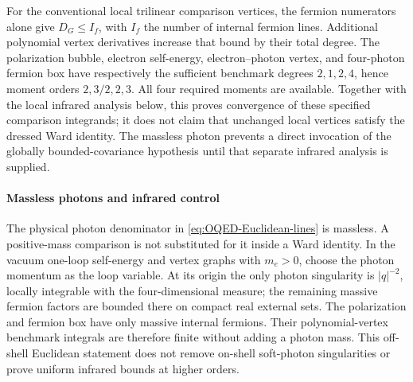 \documentclass[final,5p,times,twocolumn,numbers,nopreprintline]{elsarticle}
\numberwithin{equation}{section}
\theoremstyle{definition}
\theoremstyle{remark}
\begin{document}
For the conventional local trilinear comparison vertices, the fermion
numerators alone give \(D_G\leq I_f\), with \(I_f\) the number
of internal fermion lines. Additional polynomial vertex derivatives
increase that bound by their total degree. The polarization bubble,
electron self-energy, electron--photon vertex, and four-photon fermion
box have respectively the sufficient benchmark degrees
\(2,1,2,4\), hence moment orders \(2,3/2,2,3\).
All four required moments are available. Together with the local
infrared analysis below, this proves convergence of these specified
comparison integrands; it does not claim that unchanged local vertices
satisfy the dressed Ward identity. The massless photon prevents a
direct invocation of the globally bounded-covariance hypothesis until
that separate infrared analysis is supplied.

\paragraph{Massless photons and infrared control}
The physical photon denominator in \eqref{eq:OQED-Euclidean-lines}
is massless. A positive-mass comparison is not substituted for it inside
a Ward identity. In the vacuum one-loop self-energy and vertex graphs
with \(m_e>0\), choose the photon momentum as the loop variable.
At its origin the only photon singularity is \(|q|^{-2}\), locally
integrable with the four-dimensional measure; the remaining massive
fermion factors are bounded there on compact real external sets.
The polarization and fermion box have only massive internal fermions.
Their polynomial-vertex benchmark integrals are therefore finite
without adding a photon mass. This off-shell Euclidean statement does
not remove on-shell soft-photon singularities or prove uniform
infrared bounds at higher orders.
\end{document}
